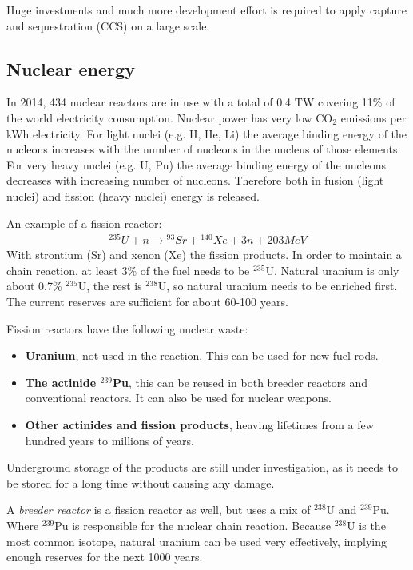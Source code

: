 \documentclass[a4paper,10pt]{article}
\begin{document}
Huge investments and much more development effort is required to apply capture and sequestration (CCS) on a large scale.

\subsection{Nuclear energy}
In 2014, 434 nuclear reactors are in use with a total of 0.4 TW covering 11\% of the world electricity consumption. Nuclear power has very low CO$_2$ emissions per kWh electricity. For light nuclei (e.g. H, He, Li) the average binding energy of the nucleons increases with the number of nucleons in the nucleus of those elements. For very heavy nuclei (e.g. U, Pu) the average binding energy of the nucleons decreases with increasing number of nucleons. Therefore both in fusion (light nuclei) and fission (heavy nuclei) energy is released. \bigskip

An example of a fission reactor:
\begin{align}
 {^{235}}U + n \rightarrow {^{93}}Sr + {^{140}}Xe + 3n + 203 MeV
\end{align}
With strontium (Sr) and xenon (Xe) the fission products. In order to maintain a chain reaction, at least 3\% of the fuel needs to be ${^{235}}$U. Natural uranium is only about 0.7\% ${^{235}}$U, the rest is ${^{238}}$U, so natural uranium needs to be enriched first. The current reserves are sufficient for about 60-100 years. \bigskip

Fission reactors have the following nuclear waste:
\begin{itemize}
 \item \textbf{Uranium}, not used in the reaction. This can be used for new fuel rods.
 \item \textbf{The actinide ${^{239}}$Pu}, this can be reused in both breeder reactors and conventional reactors. It can also be used for nuclear weapons. 
 \item \textbf{Other actinides and fission products}, heaving lifetimes from a few hundred years to millions of years.
\end{itemize}

Underground storage of the products are still under investigation, as it needs to be stored for a long time without causing any damage. \bigskip

A \emph{breeder reactor} is a fission reactor as well, but uses a mix of ${^{238}}$U and ${^{239}}$Pu. Where ${^{239}}$Pu is responsible for the nuclear chain reaction. Because ${^{238}}$U is the most common isotope, natural uranium can be used very effectively, implying enough reserves for the next 1000 years. \bigskip
\end{document}
